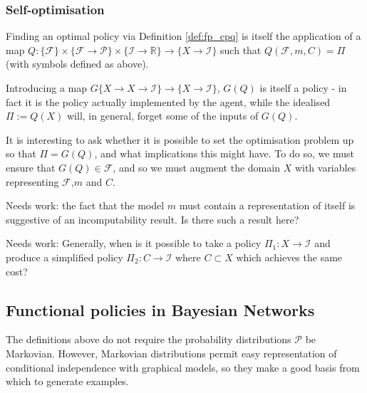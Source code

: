 

\subsubsection{Self-optimisation}\label{sssec:self_reflection}

Finding an optimal policy via Definition \ref{def:fp_cpq} is itself the application of a map $Q:\{\mathcal{F}\}\times\{\mathcal{F}\to\mathcal{P}\}\times\{\mathcal{I}\to\mathbb{R}\}\to\{X\to\mathcal{I}\}$ such that $Q(\mathcal{F},m,C)=\Pi$ (with symbols defined as above). 

Introducing a map $G\{X\to X\to \mathcal{I}\} \to \{X\to\mathcal{I}\}$, $G(Q)$ is itself a policy - in fact it is the policy actually implemented by the agent, while the idealised $\Pi:=Q(X)$ will, in general, forget some of the inputs of $G(Q)$. 

It is interesting to ask whether it is possible to set the optimisation problem up so that $\Pi=G(Q)$, and what implications this might have. To do so, we must ensure that $G(Q)\in\mathcal{F}$, and so we must augment the domain $X$ with variables representing $\mathcal{F}$,$m$ and $C$.

Needs work: the fact that the model $m$ must contain a representation of itself is suggestive of an incomputability result. Is there such a result here?

Needs work: Generally, when is it possible to take a policy $\Pi_1:X\to\mathcal{I}$ and produce a simplified policy $\Pi_2:C\to\mathcal{I}$ where $C\subset X$ which achieves the same cost?


\subsection{Functional policies in Bayesian Networks}

The definitions above do not require the probability distributions $\mathcal{P}$ be Markovian. However, Markovian distributions permit easy representation of conditional independence with graphical models, so they make a good basis from which to generate examples.

